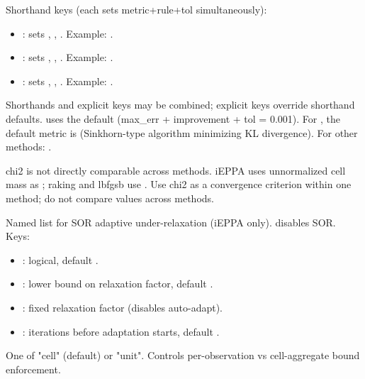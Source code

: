 \documentclass[a4paper]{book}
\begin{document}
\begin{Arguments}
\begin{ldescription}
\begin{itemize}
\end{itemize}

Shorthand keys (each sets metric+rule+tol simultaneously):
\begin{itemize}

\item{} : sets , ,
. Example: .
\item{} : sets , ,
. Example: .
\item{} : sets , ,
. Example: .

\end{itemize}

Shorthands and explicit keys may be combined; explicit keys override shorthand
defaults.  uses the default (max\_err + improvement +
tol = 0.001). For , the default metric is 
(Sinkhorn-type algorithm minimizing KL divergence). For other methods: .

 chi2 is not directly comparable
across methods. iEPPA uses unnormalized cell mass as ;
raking and lbfgsb use . Use chi2 as a convergence criterion
within one method; do not compare values across methods.

\item[\code{sor}] Named list for SOR adaptive under-relaxation (iEPPA only).
 disables SOR. Keys:
\begin{itemize}

\item{} : logical, default .
\item{} : lower bound on relaxation factor, default .
\item{} : fixed relaxation factor (disables auto-adapt).
\item{} : iterations before adaptation starts, default .

\end{itemize}


\item[\code{bounds\_mode}] One of "cell" (default) or "unit". Controls per-observation
vs cell-aggregate bound enforcement.


\end{ldescription}
\end{Arguments}
\end{document}
